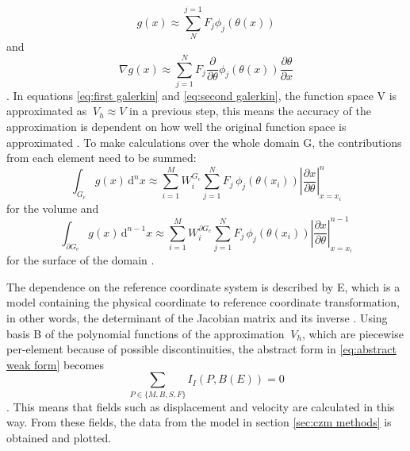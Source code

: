 \documentclass[10pt]{article}
\begin{document}
\begin{equation}
g(x) \approx \sum_{N}^{j=1} F_j \phi_j(\theta(x))
\label{eq:first galerkin}
\end{equation} and \begin{equation}
  \nabla g(x) \approx \sum_{j=1}^{N} F_j \frac{\partial}{\partial \theta} \phi_j (\theta(x))\frac{\partial\theta}{\partial x}
  \label{eq:second galerkin}
\end{equation} \parencite{afanasievModularFlexibleSpectralelement2019}. In equations \ref{eq:first galerkin} and \ref{eq:second galerkin}, the function space V is approximated as $\ V_h \approx V$ in a previous step, this means the accuracy of the approximation is dependent on how well the original function space is approximated \parencite{afanasievModularFlexibleSpectralelement2019}. To make calculations over the whole domain G, the contributions from each element need to be summed: \begin{equation} 
  \int_{G_e} g(x)\,\mathrm{d}^n x \approx \sum_{i=1}^{M} W_i^{G_e} \sum_{j=1}^{N} F_j\,\phi_j(\theta(x_i))\left|\frac{\partial x}{\partial \theta}\right|_{x=x_i}^n
  \label{eq:domain integral}
\end{equation} for the volume and \begin{equation}
  \int_{\partial G_e} g(x)\,\mathrm{d}^{n-1} x \approx \sum_{i=1}^{M} W_i^{\partial G_e} \sum_{j=1}^{N} F_j\,\phi_j(\theta(x_i))\left|\frac{\partial x}{\partial \theta}\right|_{x=x_i}^{n-1}
  \label{eq:surface integral}
\end{equation} for the surface of the domain \parencite{afanasievModularFlexibleSpectralelement2019}. \par

The dependence on the reference coordinate system is described by E, which is a model containing the physical coordinate to reference coordinate transformation, in other words, the determinant of the Jacobian matrix and its inverse \parencite{afanasievModularFlexibleSpectralelement2019}. Using basis B of the polynomial functions of the approximation $\ V_h$, which are piecewise per-element because of possible discontinuities, the abstract form in \ref{eq:abstract weak form} becomes \begin{equation}
  \sum_{P \in \{M,B,S,F\}} I_I(P,B(E)) = 0
  \label{eq:abstract approximation}
\end{equation} \parencite{afanasievModularFlexibleSpectralelement2019}. This means that fields such as displacement and velocity are calculated in this way. From these fields, the data from the model in section \ref{sec:czm methods} is obtained and plotted. 
\end{document}
